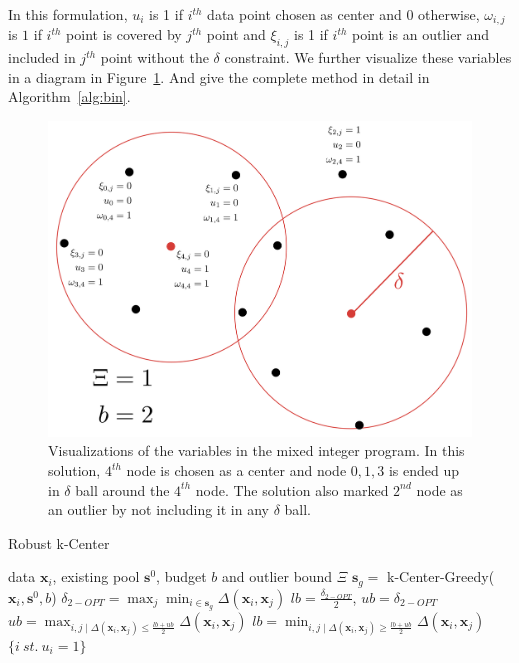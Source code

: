 \documentclass{article}
\begin{document}
In this formulation, $u_i$ is 1 if $i^{th}$ data point chosen as center and $0$ otherwise, $\omega_{i,j}$ is $1$ if $i^{th}$ point is covered by $j^{th}$ point and $\xi_{i,j}$ is 1 if $i^{th}$ point is an outlier and included in $j^{th}$ point without the $\delta$ constraint. We further visualize these variables in a diagram in Figure~\ref{mip}. And give the complete method in detail in Algorithm~\ref{alg:bin}. 


\begin{figure}[h]
\includegraphics[width=\columnwidth]{mip.pdf}
    \caption{Visualizations of the variables in the mixed integer program. In this solution, $4^{th}$ node is chosen as a center and node $0,1,3$ is ended up in $\delta$ ball around the $4^{th}$ node. The solution also marked $2^{nd}$ node as an outlier by not including it in any $\delta$ ball.}
\label{mip}
\end{figure}


\begin{algorithm}[tb]
   \caption{Robust k-Center}
   \label{alg:bin}
\begin{algorithmic}
    data $\mathbf{x}_i$, existing pool $\mathbf{s}^0$, budget $b$ and outlier bound $\Xi$
    $\mathbf{s}_g =$ k-Center-Greedy($\mathbf{x}_i, \mathbf{s}^0, b$)
   \STATE $\delta_{2-OPT} = \max_j \min_{i \in \mathbf{s}_g} \Delta(\mathbf{x}_i,\mathbf{x}_j)$ 
   \STATE $lb=\frac{\delta_{2-OPT}}{2}$, $ub=\delta_{2-OPT}$
   \REPEAT
   \STATE $ub=\max_{i,j \mid  \Delta(\mathbf{x}_i,\mathbf{x}_j) \leq \frac{lb+ub}{2}}  \Delta(\mathbf{x}_i,\mathbf{x}_j) $
   \ELSE
   \STATE $lb=\min_{i,j \mid   \Delta(\mathbf{x}_i,\mathbf{x}_j) \geq \frac{lb+ub}{2}}  \Delta(\mathbf{x}_i,\mathbf{x}_j) $
    \ENDIF
       $\{i\ st.\ u_i=1\}$
\end{algorithmic}
\end{algorithm}
\end{document}
